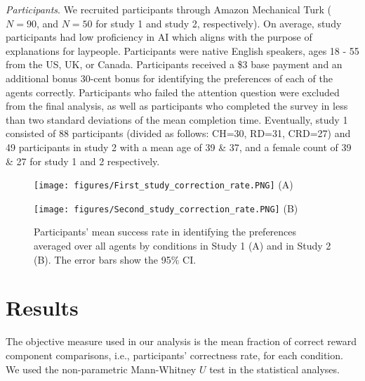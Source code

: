 \documentclass{ecai}
\begin{document}
\emph{Participants}. We recruited participants through Amazon Mechanical Turk ($N=90$, and $N=50$ for study 1 and study 2, respectively). On average, study participants had low proficiency in AI which aligns with the purpose of explanations for laypeople. Participants were native English speakers, ages 18 - 55 from the US, UK, or Canada.
Participants received a \$3 base payment and an additional bonus 30-cent bonus for identifying the preferences of each of the agents correctly. Participants who failed the attention question were excluded from the final analysis, as well as participants who completed the survey in less than two standard deviations of the mean completion time. Eventually, study 1 consisted of 88 participants (divided as follows: CH=30, RD=31, CRD=27) and 49 participants in study 2 with a mean age of 39 \& 37, and a female count of 39 \& 27 for study 1 and 2 respectively.


\begin{figure}[t]
\begin{minipage}{0.49\linewidth}
\centering
\texttt{[image: figures/First\_study\_correction\_rate.PNG]}
(A)
\end{minipage}
\begin{minipage}{0.49\linewidth}
\centering
\texttt{[image: figures/Second\_study\_correction\_rate.PNG]}
(B)
\end{minipage}
\caption{Participants' mean success rate in identifying the preferences averaged over all agents by conditions in Study 1 (A) and in Study 2 (B). The error bars show the 95\% CI. }
\label{fig:results}
    \vspace{-0.2cm}
\end{figure}

\section{Results}
The objective measure used in our analysis is the  mean fraction of correct reward component comparisons, i.e., participants' correctness rate, for each condition. We used the non-parametric Mann-Whitney $U$ test in the statistical analyses.
\end{document}
